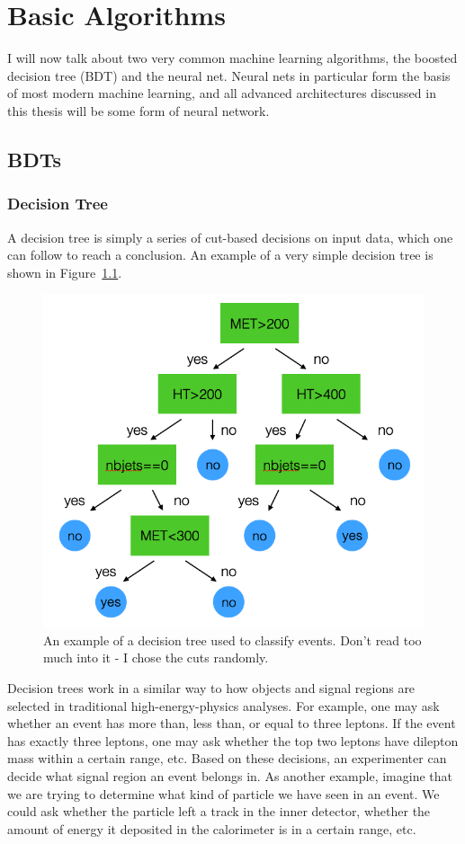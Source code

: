 \chapter{Basic Algorithms}

I will now talk about two very common machine learning algorithms, the boosted decision tree (BDT) and the neural net. Neural nets in particular form the basis of most modern machine learning, and all advanced architectures discussed in this thesis will be some form of neural network.

\section{BDTs}

\subsection*{Decision Tree}

A decision tree is simply a series of cut-based decisions on input data, which one can follow to reach a conclusion. An example of a very simple decision tree is shown in Figure~\ref{decision_tree}.

\begin{figure}[htbp]
    \centering
    \includegraphics[width=0.5\linewidth]{Images/ML/decision_tree.png}
    \caption{An example of a decision tree used to classify events. Don't read too much into it - I chose the cuts randomly.}
    \label{decision_tree}
\end{figure}

Decision trees work in a similar way to how objects and signal regions are selected in traditional high-energy-physics analyses. For example, one may ask whether an event has more than, less than, or equal to three leptons. If the event has exactly three leptons, one may ask whether the top two leptons have dilepton mass within a certain range, etc. Based on these decisions, an experimenter can decide what signal region an event belongs in. As another example, imagine that we are trying to determine what kind of particle we have seen in an event. We could ask whether the particle left a track in the inner detector, whether the amount of energy it deposited in the calorimeter is in a certain range, etc.
 
